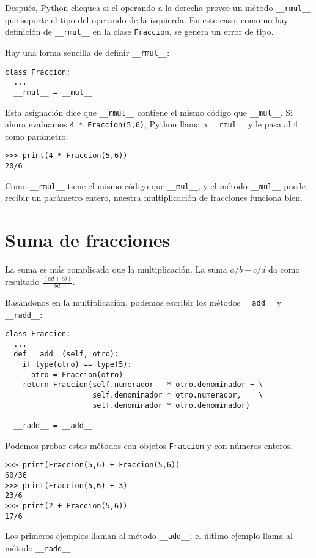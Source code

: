 Después, Python chequea si el operando a la derecha provee un método
\texttt{\_\_rmul\_\_} que soporte el tipo del operando de la izquierda.
En este caso, como no hay definición de \texttt{\_\_rmul\_\_} en la
clase \texttt{Fraccion}, se genera un error de tipo.

Hay una forma sencilla de definir \texttt{\_\_rmul\_\_}:
\begin{lstlisting}
class Fraccion:
  ...
  __rmul__ = __mul__
\end{lstlisting}
 Esta asignación dice que \texttt{\_\_rmul\_\_} contiene el mismo
código que \texttt{\_\_mul\_\_}. Si ahora evaluamos \texttt{4 {*}
Fraccion(5,6)}, Python llama a \texttt{\_\_rmul\_\_} y le pasa al
4 como parámetro:

\begin{lstlisting}
>>> print(4 * Fraccion(5,6))
20/6
\end{lstlisting}
 Como \texttt{\_\_rmul\_\_} tiene el mismo código que \texttt{\_\_mul\_\_},
y el método \texttt{\_\_mul\_\_} puede recibir un parámetro entero,
nuestra multiplicación de fracciones funciona bien.

\section{Suma de fracciones}

 

La suma es más complicada que la multiplicación. La suma $a/b+c/d$
da como resultado $\frac{(ad+cb)}{bd}$.

Basándonos en la multiplicación, podemos escribir los métodos \texttt{\_\_add\_\_}
y \texttt{\_\_radd\_\_}:

\begin{lstlisting}
class Fraccion:
  ...
  def __add__(self, otro):
    if type(otro) == type(5):
      otro = Fraccion(otro)
    return Fraccion(self.numerador   * otro.denominador + \
                    self.denominador * otro.numerador,    \
                    self.denominador * otro.denominador) 

  __radd__ = __add__
\end{lstlisting}
 Podemos probar estos métodos con objetos \texttt{Fraccion} y con
números enteros.

\begin{lstlisting}
>>> print(Fraccion(5,6) + Fraccion(5,6))
60/36
>>> print(Fraccion(5,6) + 3)
23/6
>>> print(2 + Fraccion(5,6))
17/6
\end{lstlisting}
 Los primeros ejemplos llaman al método \texttt{\_\_add\_\_}; el último
ejemplo llama al método \texttt{\_\_radd\_\_}.

